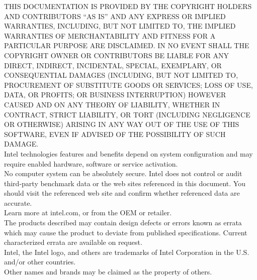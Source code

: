 {\footnotesize

\noindent THIS DOCUMENTATION IS PROVIDED BY THE COPYRIGHT HOLDERS AND
CONTRIBUTORS ``AS IS'' AND ANY EXPRESS OR IMPLIED WARRANTIES, INCLUDING, BUT
NOT LIMITED TO, THE
IMPLIED WARRANTIES OF MERCHANTABILITY AND FITNESS FOR A PARTICULAR PURPOSE ARE
DISCLAIMED. IN NO EVENT SHALL THE COPYRIGHT OWNER OR CONTRIBUTORS BE LIABLE
FOR ANY DIRECT, INDIRECT, INCIDENTAL, SPECIAL, EXEMPLARY, OR CONSEQUENTIAL
DAMAGES (INCLUDING, BUT NOT LIMITED TO, PROCUREMENT OF SUBSTITUTE GOODS OR
SERVICES; LOSS OF USE, DATA, OR PROFITS; OR BUSINESS INTERRUPTION) HOWEVER
CAUSED AND ON ANY THEORY OF LIABILITY, WHETHER IN CONTRACT, STRICT LIABILITY,
OR TORT (INCLUDING NEGLIGENCE OR OTHERWISE) ARISING IN ANY WAY OUT OF THE USE
OF THIS SOFTWARE, EVEN IF ADVISED OF THE POSSIBILITY OF SUCH DAMAGE. \\

\noindent Intel technologies features and benefits depend on system
configuration and may require enabled hardware, software or service
activation. \\

\noindent No computer system can be absolutely secure. Intel does not control
or audit third-party benchmark data or the web sites referenced in this
document. You should visit the referenced web site and confirm whether
referenced data are accurate.  \\

\noindent Learn more at intel.com, or from the OEM or retailer. \\

\noindent The products described may contain design defects or errors known as
errata which may cause the product to deviate from published
specifications. Current characterized errata are available on request. \\

\noindent Intel, the Intel logo, and others are trademarks of Intel Corporation
in the U.S. and/or other countries. \\

\noindent *Other names and brands may be claimed as the property of others. \\



}

